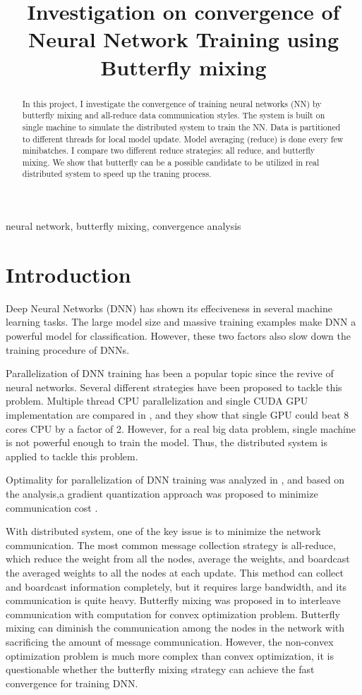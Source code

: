 \documentclass{article}
\title{Investigation on convergence of Neural Network Training using Butterfly mixing}
\begin{document}
%
\maketitle
%
\begin{abstract}
In this project, I investigate the convergence of training neural networks (NN) by butterfly mixing and all-reduce data communication styles. The system is built on single machine to simulate the distributed system to train the NN. Data is partitioned to different threads for local model update. Model averaging (reduce) is done every few minibatches. I compare two different reduce strategies: all reduce, and butterfly mixing. We show that butterfly can be a possible candidate to be utilized in real distributed system to speed up the traning process.

\end{abstract}
%
\begin{keywords}
neural network, butterfly mixing, convergence analysis
\end{keywords}
%
\section{Introduction}
\label{sec:intro}

Deep Neural Networks (DNN) has shown its effeciveness in several machine learning tasks. The large model size and massive training examples make DNN a powerful model for classification. However, these two factors also slow down the training procedure of DNNs.

Parallelization of DNN training has been a popular topic since the revive of neural networks. Several different strategies have been proposed to tackle this problem. Multiple thread CPU parallelization and single CUDA GPU implementation are compared in \cite{scanzio2010parallel,vesely2010parallel}, and they show that single GPU could beat 8 cores CPU by a factor of 2. However, for a real big data problem, single machine is not powerful enough to train the model. Thus, the distributed system is applied to tackle this problem.

Optimality for parallelization of DNN training was analyzed in \cite{seide2014parallelizability}, and based on the analysis,a gradient quantization approach was proposed to minimize communication cost \cite{seide20141}.

With distributed system, one of the key issue is to minimize the network communication. The most common message collection strategy is all-reduce, which reduce the weight from all the nodes, average the weights, and boardcast the averaged weights to all the nodes at each update. This method can collect and boardcast information completely, but it requires large bandwidth, and its communication is quite heavy. Butterfly mixing was proposed in \cite{zhao2013butterfly} to interleave communication with computation for convex optimization problem. Butterfly mixing can diminish the communication among the nodes in the network with sacrificing the amount of message communication. However, the non-convex optimization problem is much more complex than convex optimization, it is questionable whether the butterfly mixing strategy can achieve the fast convergence for training DNN.
\end{document}
